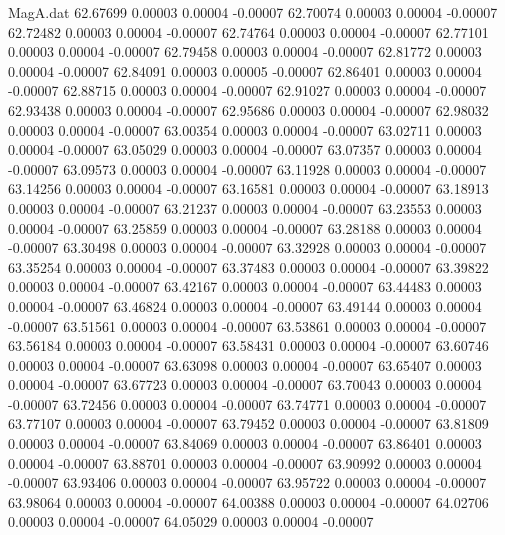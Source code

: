 \begin{filecontents}{MagA.dat}
  62.67699    0.00003    0.00004   -0.00007
  62.70074    0.00003    0.00004   -0.00007
  62.72482    0.00003    0.00004   -0.00007
  62.74764    0.00003    0.00004   -0.00007
  62.77101    0.00003    0.00004   -0.00007
  62.79458    0.00003    0.00004   -0.00007
  62.81772    0.00003    0.00004   -0.00007
  62.84091    0.00003    0.00005   -0.00007
  62.86401    0.00003    0.00004   -0.00007
  62.88715    0.00003    0.00004   -0.00007
  62.91027    0.00003    0.00004   -0.00007
  62.93438    0.00003    0.00004   -0.00007
  62.95686    0.00003    0.00004   -0.00007
  62.98032    0.00003    0.00004   -0.00007
  63.00354    0.00003    0.00004   -0.00007
  63.02711    0.00003    0.00004   -0.00007
  63.05029    0.00003    0.00004   -0.00007
  63.07357    0.00003    0.00004   -0.00007
  63.09573    0.00003    0.00004   -0.00007
  63.11928    0.00003    0.00004   -0.00007
  63.14256    0.00003    0.00004   -0.00007
  63.16581    0.00003    0.00004   -0.00007
  63.18913    0.00003    0.00004   -0.00007
  63.21237    0.00003    0.00004   -0.00007
  63.23553    0.00003    0.00004   -0.00007
  63.25859    0.00003    0.00004   -0.00007
  63.28188    0.00003    0.00004   -0.00007
  63.30498    0.00003    0.00004   -0.00007
  63.32928    0.00003    0.00004   -0.00007
  63.35254    0.00003    0.00004   -0.00007
  63.37483    0.00003    0.00004   -0.00007
  63.39822    0.00003    0.00004   -0.00007
  63.42167    0.00003    0.00004   -0.00007
  63.44483    0.00003    0.00004   -0.00007
  63.46824    0.00003    0.00004   -0.00007
  63.49144    0.00003    0.00004   -0.00007
  63.51561    0.00003    0.00004   -0.00007
  63.53861    0.00003    0.00004   -0.00007
  63.56184    0.00003    0.00004   -0.00007
  63.58431    0.00003    0.00004   -0.00007
  63.60746    0.00003    0.00004   -0.00007
  63.63098    0.00003    0.00004   -0.00007
  63.65407    0.00003    0.00004   -0.00007
  63.67723    0.00003    0.00004   -0.00007
  63.70043    0.00003    0.00004   -0.00007
  63.72456    0.00003    0.00004   -0.00007
  63.74771    0.00003    0.00004   -0.00007
  63.77107    0.00003    0.00004   -0.00007
  63.79452    0.00003    0.00004   -0.00007
  63.81809    0.00003    0.00004   -0.00007
  63.84069    0.00003    0.00004   -0.00007
  63.86401    0.00003    0.00004   -0.00007
  63.88701    0.00003    0.00004   -0.00007
  63.90992    0.00003    0.00004   -0.00007
  63.93406    0.00003    0.00004   -0.00007
  63.95722    0.00003    0.00004   -0.00007
  63.98064    0.00003    0.00004   -0.00007
  64.00388    0.00003    0.00004   -0.00007
  64.02706    0.00003    0.00004   -0.00007
  64.05029    0.00003    0.00004   -0.00007

\end{filecontents}
